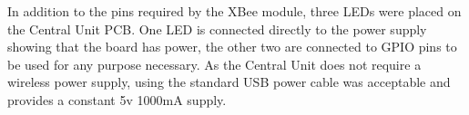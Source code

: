 In addition to the pins required by the XBee module, three LEDs were placed on the Central Unit PCB. One LED is connected directly to the power supply showing that the board has power, the other two are connected to GPIO pins to be used for any purpose necessary.
As the Central Unit does not require a wireless power supply, using the standard USB power cable was acceptable and provides a constant 5v 1000mA supply.
